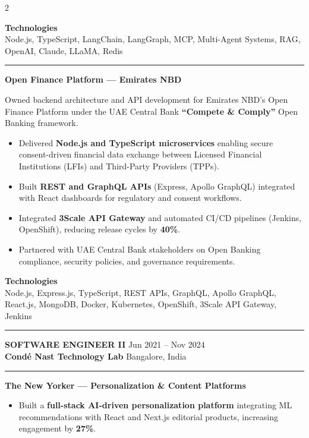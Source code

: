 \documentclass[10pt,a4paper]{article}
\newcommand{\blockdivider}{\vspace{0pt}\color{rulecolor}\rule{\linewidth}{0.5pt}\color{primary}\vspace{4pt}}
\newcommand{\roleheader}[4]{%
  \noindent
  \textbf{\MakeUppercase{#3}}%
  \hfill
  \textcolor{secondary}{#4}\\[0pt]

  \noindent
  \textbf{#1}%
  \hfill
  \textcolor{secondary}{#2}\\[0pt]
}
\newcommand{\roledivider}{%
  \vspace{-1pt}%
  {\color{rulecolor}\rule{\linewidth}{0.5pt}}%
  \vspace{2pt}%
}
\newcommand{\projecttitle}[1]{\textbf{#1}\par\vspace{2pt}}
\begin{document}
\begin{paracol}{2}
\begin{itemize}
\end{itemize}

\textbf{Technologies}\\
Node.js, TypeScript, LangChain, LangGraph, MCP, Multi-Agent Systems, RAG, OpenAI, Claude, LLaMA, Redis

\blockdivider

\projecttitle{Open Finance Platform — Emirates NBD}

Owned backend architecture and API development for Emirates NBD's Open Finance Platform under the UAE Central Bank \textbf{``Compete \& Comply''} Open Banking framework.

\begin{itemize}

\item Delivered \textbf{Node.js and TypeScript microservices} enabling secure consent-driven financial data exchange between Licensed Financial Institutions (LFIs) and Third-Party Providers (TPPs).

\item Built \textbf{REST and GraphQL APIs} (Express, Apollo GraphQL) integrated with React dashboards for regulatory and consent workflows.

\item Integrated \textbf{3Scale API Gateway} and automated CI/CD pipelines (Jenkins, OpenShift), reducing release cycles by \textbf{40\%}.

\item Partnered with UAE Central Bank stakeholders on Open Banking compliance, security policies, and governance requirements.

\end{itemize}

\textbf{Technologies}\\
Node.js, Express.js, TypeScript, REST APIs, GraphQL, Apollo GraphQL, React.js, MongoDB, Docker, Kubernetes, OpenShift, 3Scale API Gateway, Jenkins

\blockdivider


\roleheader{Cond\'e Nast Technology Lab}{Bangalore, India}{Software Engineer II}{Jun 2021 -- Nov 2024}
\roledivider
\projecttitle{ The New Yorker — Personalization \& Content Platforms}

\begin{itemize}

\item Built a \textbf{full-stack AI-driven personalization platform} integrating ML recommendations with React and Next.js editorial products, increasing engagement by \textbf{27\%}.


\end{itemize}
\end{paracol}
\end{document}
